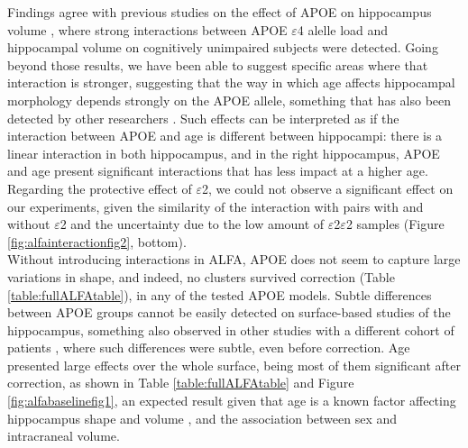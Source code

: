 Findings agree with previous studies on the effect of APOE on hippocampus volume \cite{Pievani2011,Mueller2009,Cacciaglia2018}, where strong interactions between APOE $\varepsilon$4 alelle load and hippocampal volume on cognitively unimpaired subjects were detected. Going beyond those results, we have been able to suggest specific areas where that interaction is stronger, suggesting that the way in which age affects hippocampal morphology depends strongly on the APOE allele, something that has also been detected by other researchers \cite{Shi2014}. Such effects can be interpreted as if the interaction between APOE and age is different between hippocampi: there is a linear interaction in both hippocampus, and in the right hippocampus, APOE and age present significant interactions that has less impact at a higher age. Regarding the protective effect of $\varepsilon$2, we could not observe a significant effect on our experiments, given the similarity of the interaction with pairs with and without $\varepsilon$2 and the uncertainty due to the low amount of $\varepsilon$2$\varepsilon$2 samples (Figure \ref{fig:alfainteractionfig2}, bottom). \\

Without introducing interactions in ALFA, APOE does not seem to capture large variations in shape, and indeed, no clusters survived correction (Table \ref{table:fullALFAtable}), in any of the tested APOE models. Subtle differences between APOE groups cannot be easily detected on surface-based studies of the hippocampus, something also observed in other studies with a different cohort of patients \cite{Dong2019}, where such differences were subtle, even before correction. Age presented large effects over the whole surface, being most of them significant after correction, as shown in Table \ref{table:fullALFAtable} and Figure \ref{fig:alfabaselinefig1}, an expected result given that age is a known factor affecting hippocampus shape and volume \cite{Lind2006}, and the association between sex and intracraneal volume. \\ 

